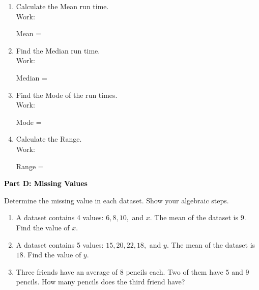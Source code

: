 \documentclass[12pt, letterpaper, fleqn]{article}
\newcommand{\blankshorter}{\underline{\hspace{1.5cm}}}
\begin{document}
\begin{enumerate}[itemsep=1cm, leftmargin=0.6cm]
\item Calculate the Mean run time. \\
Work: \\ 

\vspace{1cm}

Mean = \blankshorter{}

\item Find the Median run time. \\
Work: \\ 

\vspace{1cm}

Median = \blankshorter{}

\item Find the Mode of the run times. \\
Work: \\ 

\vspace{1cm}

Mode = \blankshorter{}

\item Calculate the Range. \\
Work: \\ 

\vspace{1cm}

Range = \blankshorter{}
\end{enumerate}

\newpage

\begin{tcolorbox}[colback=black!10]
    \large\textcolor{black}{\textbf{Part D: Missing Values}}
\end{tcolorbox}

\vspace{3mm}

\noindent
Determine the missing value in each dataset. Show your algebraic steps.

\vspace{5mm}

\begin{enumerate}[itemsep=4cm, leftmargin=0.6cm]
\item A dataset contains 4 values: $6, 8, 10,$ and $x$. The mean of the dataset is $9$. Find the value of $x$.
\vspace{1cm}

\item A dataset contains 5 values: $15, 20, 22, 18,$ and $y$. The mean of the dataset is $18$. Find the value of $y$.
\vspace{1cm}

\item Three friends have an average of $8$ pencils each. Two of them have $5$ and $9$ pencils. How many pencils does the third friend have?
\end{enumerate}
\end{document}
